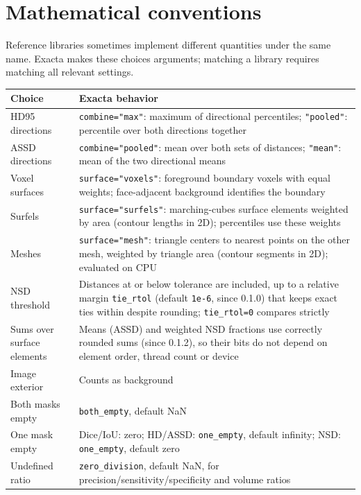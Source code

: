 \chapter{Mathematical conventions}\label{ch:conventions}

Reference libraries sometimes implement different quantities under the same name. Exacta
makes these choices arguments; matching a library requires matching all relevant settings.

{\small{} %
\begin{longtable}[]{@{}
  >{\raggedright\arraybackslash}p{}
  >{\raggedright\arraybackslash}p{}@{}}
\toprule\noalign{}
\begin{minipage}[b]{\linewidth}\raggedright
Choice
\end{minipage} & \begin{minipage}[b]{\linewidth}\raggedright
Exacta behavior
\end{minipage} \\
\midrule\noalign{}
\endhead
\bottomrule\noalign{}
\endlastfoot
HD95 directions & \texttt{combine="max"}: maximum of directional percentiles; \texttt{"pooled"}: percentile over both directions together \\
ASSD directions & \texttt{combine="pooled"}: mean over both sets of distances; \texttt{"mean"}: mean of the two directional means \\
Voxel surfaces & \texttt{surface="voxels"}: foreground boundary voxels with equal weights; face-adjacent background identifies the boundary \\
Surfels & \texttt{surface="surfels"}: marching-cubes surface elements weighted by area (contour lengths in 2D); percentiles use these weights \\
Meshes & \texttt{surface="mesh"}: triangle centers to nearest points on the other mesh, weighted by triangle area (contour segments in 2D); evaluated on CPU \\
NSD threshold & Distances at or below tolerance are included, up to a relative margin \texttt{tie\_rtol} (default \texttt{1e-6}, since 0.1.0) that keeps exact ties within despite rounding; \texttt{tie\_rtol=0} compares strictly \\
Sums over surface elements & Means (ASSD) and weighted NSD fractions use correctly rounded sums (since 0.1.2), so their bits do not depend on element order, thread count or device \\
Image exterior & Counts as background \\
Both masks empty & \texttt{both\_empty}, default NaN \\
One mask empty & Dice/IoU: zero; HD/ASSD: \texttt{one\_empty}, default infinity; NSD: \texttt{one\_empty}, default zero \\
Undefined ratio & \texttt{zero\_division}, default NaN, for precision/sensitivity/specificity and volume ratios \\
\end{longtable}
}

